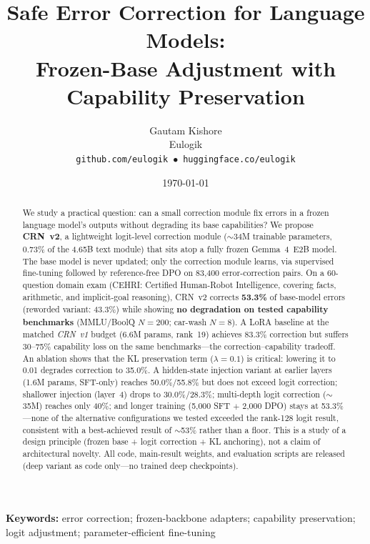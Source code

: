 \documentclass[11pt]{article}
\title{\vspace{-1.2em}
\Large\textbf{Safe Error Correction for Language Models:\\[0.2em] Frozen-Base Adjustment with\\Capability Preservation}
\vspace{0.6em}}
\author{Gautam Kishore\\Eulogik\\\texttt{github.com/eulogik}~$\bullet$~\texttt{huggingface.co/eulogik}}
\date{\today}
\begin{document}
\maketitle

\begin{center}
\footnotesize
\textbf{Keywords:} error correction; frozen-backbone adapters; capability preservation; logit adjustment; parameter-efficient fine-tuning
\end{center}

\vspace{-0.5em}

\begin{abstract}
\noindent
We study a practical question: can a small correction module fix errors in a frozen language model's outputs without degrading its base capabilities?
We propose \textbf{CRN~v2}, a lightweight logit-level correction module ($\sim$34M trainable parameters, 0.73\% of the 4.65B text module) that sits atop a fully frozen Gemma~4~E2B model.
The base model is never updated; only the correction module learns, via supervised fine-tuning followed by reference-free DPO on 83{,}400 error-correction pairs.
On a 60-question domain exam (CEHRI: Certified Human-Robot Intelligence, covering facts, arithmetic, and implicit-goal reasoning), CRN~v2 corrects \textbf{53.3\%} of base-model errors (reworded variant: 43.3\%) while showing \textbf{no degradation on tested capability benchmarks} (MMLU/BoolQ $N{=}200$; car-wash $N{=}8$).
A LoRA baseline at the matched \emph{CRN~v1} budget (6.6M params, rank~19) achieves 83.3\% correction but suffers 30--75\% capability loss on the same benchmarks---the correction--capability tradeoff.
An ablation shows that the KL preservation term ($\lambda{=}0.1$) is critical: lowering it to 0.01 degrades correction to 35.0\%.
A hidden-state injection variant at earlier layers (1.6M params, SFT-only) reaches 50.0\%/55.8\% but does not exceed logit correction; shallower injection (layer~4) drops to 30.0\%/28.3\%; multi-depth logit correction ($\sim$35M) reaches only 40\%; and longer training (5{,}000 SFT $+$ 2{,}000 DPO) stays at 53.3\%---none of the alternative configurations we tested exceeded the rank-128 logit result, consistent with a best-achieved result of $\sim$53\% rather than a floor.
This is a study of a design principle (frozen base + logit correction + KL anchoring), not a claim of architectural novelty.
All code, main-result weights, and evaluation scripts are released (deep variant as code only---no trained deep checkpoints).
\end{abstract}
\end{document}
